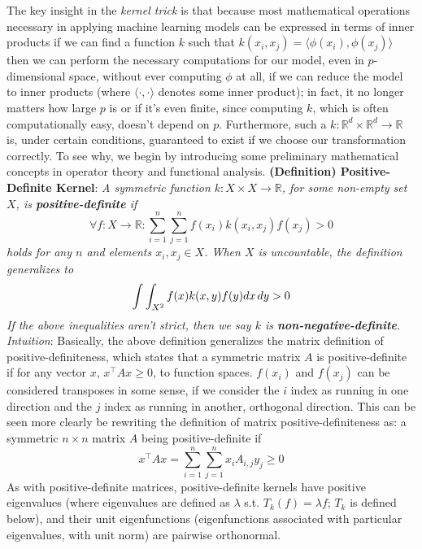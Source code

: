 \newline \newline
The key insight in the \textit{kernel trick} is that because most mathematical operations necessary in applying machine learning models can be expressed in terms of inner products if we can find a function $ k $ such that $ k(x_i, x_j) = \langle \phi(x_i), \phi(x_j) \rangle $ then we can perform the necessary computations for our model, even in $ p $-dimensional space, without ever computing $ \phi $ at all, if we can reduce the model to inner products (where $ \langle \cdot, \cdot \rangle $ denotes some inner product); in fact, it no longer matters how large $ p $ is or if it's even finite, since computing $ k $, which is often computationally easy, doesn't depend on $ p $. Furthermore, such a $ k: \mathbb{R}^d \times \mathbb{R}^d \rightarrow \mathbb{R} $ is, under certain conditions, guaranteed to exist if we choose our transformation correctly. To see why, we begin by introducing some preliminary mathematical concepts in operator theory and functional analysis.
\newline \newline
\textbf{(Definition) Positive-Definite Kernel}: \textit{A symmetric function $ k: X \times X \rightarrow \mathbb{R} $, for some non-empty set $ X $, is \textbf{positive-definite} if}
$$ \forall f: X \rightarrow \mathbb{R}: \sum_{i = 1}^n \sum_{j = 1}^n f(x_i) k(x_i, x_j) f(x_j) > 0 $$
\indent \textit{holds for any $ n $ and elements $ x_i, x_j \in X $. When $ X $ is uncountable, the definition generalizes to}
$$ \int \int_{X^2} f(x) k(x, y) f(y) dx \hspace{0.02in} dy > 0 $$
\indent \textit{If the above inequalities aren't strict, then we say $ k $ is \textbf{non-negative-definite}.}
\newline
\indent \textit{Intuition}: Basically, the above definition generalizes the matrix definition of positive-definiteness, which states that a symmetric matrix $ A $ is positive-definite if for any vector $ x $, $ x^\intercal A x \geq 0 $, to function spaces. $ f(x_i) $ and $ f(x_j) $ can be considered transposes in some sense, if we consider the $ i $ index as running in one direction and the $ j $ index as running in another, orthogonal direction. This can be seen more clearly be rewriting the definition of matrix positive-definiteness as: a symmetric $ n \times n $ matrix $ A $ being positive-definite if
$$ x^\intercal A x = \sum_{i = 1}^n \sum_{j = 1}^n x_i A_{i, j} y_j \geq 0 $$
As with positive-definite matrices, positive-definite kernels have positive eigenvalues (where eigenvalues are defined as $ \lambda $ s.t. $ T_k(f) = \lambda f $; $ T_k $ is defined below), and their unit eigenfunctions (eigenfunctions associated with particular eigenvalues, with unit norm) are pairwise orthonormal.
